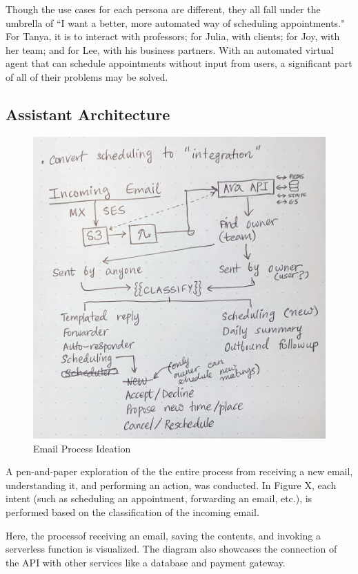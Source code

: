 \documentclass{article}
\begin{document}
Though the use cases for each persona are different, they all fall under the umbrella of ``I want a better, more automated way of scheduling appointments." For Tanya, it is to interact with professors; for Julia, with clients; for Joy, with her team; and for Lee, with his business partners. With an automated virtual agent that can schedule appointments without input from users, a significant part of all of their problems may be solved.

\subsection{Assistant Architecture}

\begin{figure}\centering
	\includegraphics[scale=0.097]{drawing-all-process.jpg}
	\caption{Email Process Ideation}
\end{figure}

A pen-and-paper exploration of the the entire process from receiving a new email, understanding it, and performing an action, was conducted. In Figure X, each intent (such as scheduling an appointment, forwarding an email, etc.), is performed based on the classification of the incoming email.

Here, the processof receiving an email, saving the contents, and invoking a serverless function is visualized. The diagram also showcases the connection of the API with other services like a database and payment gateway.
\end{document}
